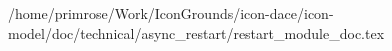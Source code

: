 /home/primrose/Work/IconGrounds/icon-dace/icon-model/doc/technical/async_restart/restart_module_doc.tex